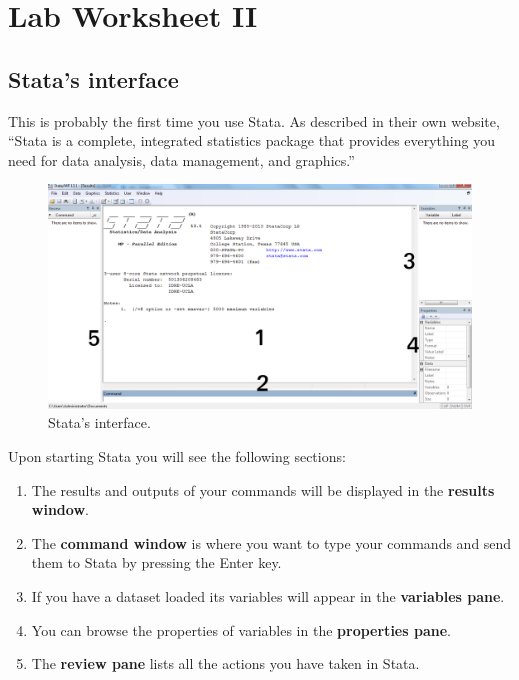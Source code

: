 \section{\hfil Lab Worksheet II \hfil}
\subsection*{Stata's interface}

This is probably the first time you use Stata. As described in their own website, ``Stata is a complete, integrated statistics package that provides everything you need for data analysis, data management, and graphics.''
 
\begin{figure}[H]
	\includegraphics[width=\linewidth]{./img/stata_interface.png}
	\caption{Stata's interface.}
\end{figure}

Upon starting Stata you will see the following sections:

\begin{enumerate}
	\item The results and outputs of your commands will be displayed in the \textbf{results window}.
	\item The \textbf{command window} is where you want to type your commands and send them to Stata by pressing the Enter key.
	\item If you have a dataset loaded its variables will appear in the \textbf{variables pane}.
	\item You can browse the properties of variables in the \textbf{properties pane}.
	\item The \textbf{review pane} lists all the actions you have taken in Stata.  
\end{enumerate}

